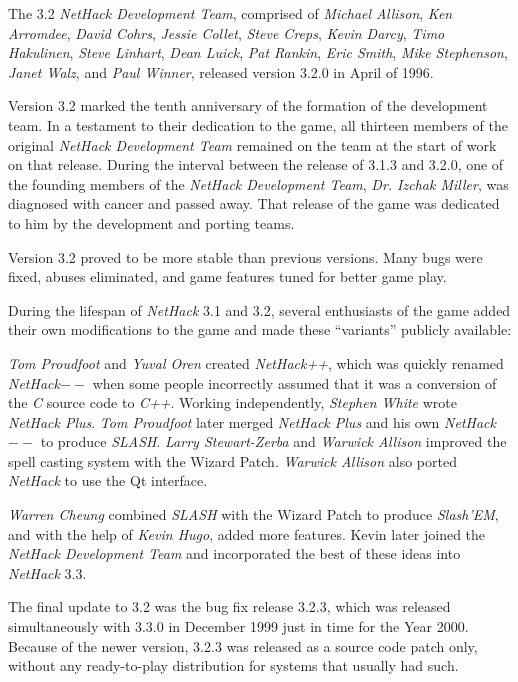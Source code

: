 \documentclass[titlepage]{article}
\begin{document}
\medskip
\noindent The 3.2 \textit{NetHack Development Team}, comprised of \textit{Michael Allison}, \textit{Ken
Arromdee}, \textit{David Cohrs}, \textit{Jessie Collet}, \textit{Steve Creps}, {\it
Kevin Darcy}, \textit{Timo Hakulinen}, \textit{Steve Linhart}, \textit{Dean Luick},
\textit{Pat Rankin}, \textit{Eric Smith}, \textit{Mike Stephenson}, \textit{Janet Walz},
and \textit{Paul Winner}, released version 3.2.0 in April of 1996.

\medskip
\noindent Version 3.2 marked the tenth anniversary of the formation of the
development team.
In a testament to their dedication to the game, all thirteen members
of the original \textit{NetHack Development Team} remained on the team at the
start of work on that release.
During the interval between the release of 3.1.3 and 3.2.0,
one of the founding members of the \textit{NetHack Development Team},
\textit{Dr. Izchak Miller}, was diagnosed with cancer and passed away.
That release of the game was
dedicated to him by the development and porting teams.

Version 3.2 proved to be more stable than previous versions.
Many bugs were fixed, abuses eliminated, and game features tuned for
better game play.

\medskip
During the lifespan of \textit{NetHack} 3.1 and 3.2, several enthusiasts
of the game added
their own modifications to the game and made these ``variants'' publicly
available:

\medskip
\textit{Tom Proudfoot} and \textit{Yuval Oren} created \textit{NetHack++},
which was quickly renamed \textit{NetHack$--$}
when some people incorrectly assumed that it was a conversion of the
\textit{C} source code to \textit{C++}.
Working independently, \textit{Stephen White} wrote \textit{NetHack Plus}.
\textit{Tom Proudfoot} later merged \textit{NetHack Plus}
and his own \textit{NetHack$--$} to produce \textit{SLASH}.
\textit{Larry Stewart-Zerba} and \textit{Warwick Allison} improved the spell
casting system with the Wizard Patch.
\textit{Warwick Allison} also ported \textit{NetHack} to use the Qt interface.

\medskip
\textit{Warren Cheung} combined \textit{SLASH} with the Wizard Patch
to produce \textit{Slash'EM}, and
with the help of \textit{Kevin Hugo}, added more features.
Kevin later joined the \textit{NetHack Development Team} and incorporated
the best of these ideas into \textit{NetHack} 3.3.

\medskip
The final update to 3.2 was the bug fix release 3.2.3, which was released
simultaneously with 3.3.0 in December 1999 just in time for the Year 2000.
Because of the newer version, 3.2.3 was released as a source code patch only,
without any ready-to-play distribution for systems that usually had such.
\end{document}
